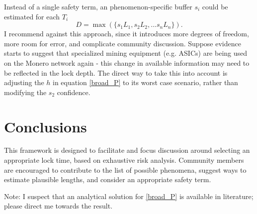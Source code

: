 \documentclass{mrl}
\begin{document}
Instead of a single safety term, an phenomenon-specific buffer $s_i$ could be estimated for each $T_i$
\begin{equation}D = \max(\{s_1L_1, s_2L_2, ... s_nL_n\}). \label{D_breakout} \end{equation}
I recommend against this approach, since it introduces more degrees of freedom, more room for error, and complicate community discussion. Suppose evidence starts to suggest that specialized mining equipment (e.g. ASICs) are being used on the Monero network again - this change in available information may need to be reflected in the lock depth. The direct way to take this into account is adjusting the $h$ in equation \ref{broad_P} to its worst case scenario, rather than modifying the $s_2$ confidence.

\section{Conclusions}
This framework is designed to facilitate and focus discussion around selecting an appropriate lock time, based on exhaustive risk analysis. Community members are encouraged to contribute to the list of possible phenomena, suggest ways to estimate plausible lengths, and consider an appropriate safety term.

Note: I suspect that an analytical solution for \ref{broad_P} is available in literature; please direct me towards the result.
\end{document}
